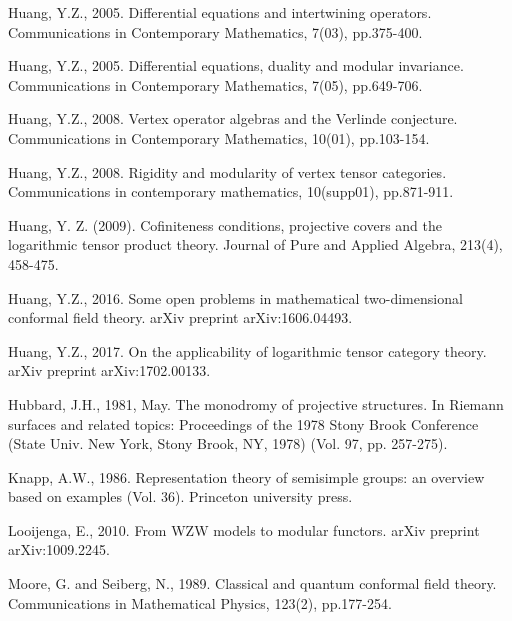 \documentclass[12pt,a4paper,notitlepage]{article}
\theoremstyle{definition}
\theoremstyle{plain}
\numberwithin{equation}{section}
\begin{document}
\begin{thebibliography}{999999}
Huang, Y.Z., 2005. Differential equations and intertwining operators. Communications in Contemporary Mathematics, 7(03), pp.375-400.

Huang, Y.Z., 2005. Differential equations, duality and modular invariance. Communications in Contemporary Mathematics, 7(05), pp.649-706.

Huang, Y.Z., 2008. Vertex operator algebras and the Verlinde conjecture. Communications in Contemporary Mathematics, 10(01), pp.103-154.

Huang, Y.Z., 2008. Rigidity and modularity of vertex tensor categories. Communications in contemporary mathematics, 10(supp01), pp.871-911.

Huang, Y. Z. (2009). Cofiniteness conditions, projective covers and the logarithmic tensor product theory. Journal of Pure and Applied Algebra, 213(4), 458-475.

Huang, Y.Z., 2016. Some open problems in mathematical two-dimensional conformal field theory. arXiv preprint arXiv:1606.04493.

Huang, Y.Z., 2017. On the applicability of logarithmic tensor category theory. arXiv preprint arXiv:1702.00133.

Hubbard, J.H., 1981, May. The monodromy of projective structures. In Riemann surfaces and related topics: Proceedings of the 1978 Stony Brook Conference (State Univ. New York, Stony Brook, NY, 1978) (Vol. 97, pp. 257-275).
		



Knapp, A.W., 1986. Representation theory of semisimple groups: an overview based on examples (Vol. 36). Princeton university press.




Looijenga, E., 2010. From WZW models to modular functors. arXiv preprint arXiv:1009.2245.

Moore, G. and Seiberg, N., 1989. Classical and quantum conformal field theory. Communications in Mathematical Physics, 123(2), pp.177-254.



\end{thebibliography}
\end{document}
